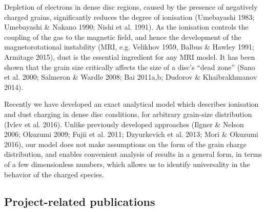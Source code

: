 \documentclass[10pt,fleqn,twoside]{article}
\newcommand{\Tcol}{\color{blue}}
\begin{document}
Depletion of electrons in dense disc regions, caused by the presence of negatively charged grains, significantly reduces the
degree of ionisation (Umebayashi 1983; Umebayashi \& Nakano 1990; Nishi et al. 1991). As the ionisation controls the coupling of the gas to the magnetic field, and hence the development of the magnetorotational instability (MRI, e.g. Velikhov 1959, Balbus \& Hawley 1991; Armitage 2015), dust is the essential ingredient for any MRI model. It has been shown that the grain size critically affects the size of a disc's ``dead zone'' (Sano et al. 2000; Salmeron \& Wardle 2008; Bai 2011a,b; Dudorov \& Khaibrakhmanov 2014).

Recently we have developed an exact analytical model which describes ionisation and dust charging in dense disc conditions,
for arbitrary grain-size distribution (Ivlev et al. 2016). Unlike previously developed approaches (Ilgner \& Nelson 2006; Okuzumi 2009; Fujii et al. 2011; Dzyurkevich et al. 2013; Mori \& Okuzumi 2016), our model does not make assumptions on the form of the grain charge distribution, and enables convenient analysis of results in a general form, in terms of a few dimensionless numbers, which allows us to identify universality in the behavior of the charged species.


\subsection{\Tcol Project-related publications}
\end{document}
